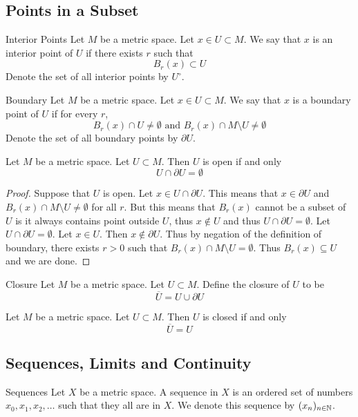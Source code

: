 \documentclass[a4paper]{article}
\begin{document}
\subsection{Points in a Subset}
\begin{defn}{Interior Points}{} Let $M$ be a metric space. Let $x\in U\subset M$. We say that $x$ is an interior point of $U$ if there exists $r$ such that $$B_r(x)\subset U$$ Denote the set of all interior points by $U^\circ$. 
\end{defn}

\begin{defn}{Boundary}{} Let $M$ be a metric space. Let $x\in U\subset M$. We say that $x$ is a boundary point of $U$ if for every $r$, $$B_r(x)\cap U\neq\emptyset\text{ and }B_r(x)\cap M\setminus U\neq\emptyset$$ Denote the set of all boundary points by $\partial U$. 
\end{defn}

\begin{prp}{}{} Let $M$ be a metric space. Let $U\subset M$. Then $U$ is open if and only $$U\cap\partial U=\emptyset$$ 
\begin{proof}
Suppose that $U$ is open. Let $x\in U\cap\partial U$. This means that $x\in\partial U$ and $B_r(x)\cap M\setminus U\neq\emptyset$ for all $r$. But this means that $B_r(x)$ cannot be a subset of $U$ is it always contains point outside $U$, thus $x\notin U$ and thus $U\cap\partial U=\emptyset$. \linebreak\linebreak
Let $U\cap\partial U=\emptyset$. Let $x\in U$. Then $x\notin\partial U$. Thus by negation of the definition of boundary, there exists $r>0$ such that $B_r(x)\cap M\setminus U=\emptyset$. Thus $B_r(x)\subseteq U$ and we are done. 
\end{proof}
\end{prp}

\begin{defn}{Closure}{} Let $M$ be a metric space. Let $U\subset M$. Define the closure of $U$ to be $$\overline{U}=U\cup\partial U$$
\end{defn}

\begin{prp}{}{} Let $M$ be a metric space. Let $U\subset M$. Then $U$ is closed if and only $$\overline{U}=U$$
\end{prp}

\subsection{Sequences, Limits and Continuity}
\begin{defn}{Sequences}{} Let $X$ be a metric space. A sequence in $X$ is an ordered set of numbers $x_0,x_1,x_2,\dots$ such that they all are in $X$. We denote this sequence by $(x_n)_{n\in\mathbb{N}}$. 
\end{defn}
\end{document}
